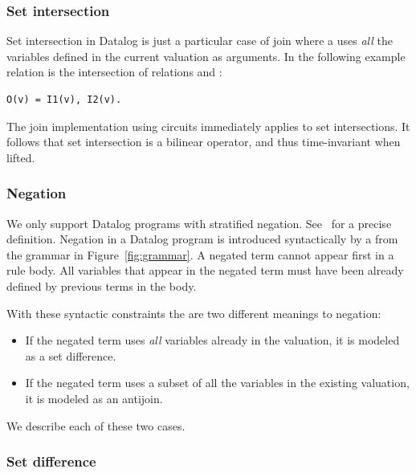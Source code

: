 \subsubsection{Set intersection}\label{sec:intersection}

Set intersection in Datalog is just a particular case of join where a 
uses \emph{all} the variables defined in the current valuation as arguments.
In the following example relation  is the
intersection of relations  and :

\begin{lstlisting}[language=ddlog]
O(v) = I1(v), I2(v).
\end{lstlisting}

The join implementation using circuits immediately applies to set intersections.
It follows that set intersection is a bilinear operator, and thus time-invariant
when lifted.

\subsubsection{Negation}\label{sec:negation}

We only support Datalog programs with stratified negation.
See~\cite{Abiteboul-book95} for a precise definition.
Negation in a Datalog program is introduced syntactically by a 
from the grammar in Figure~\ref{fig:grammar}.  A negated term
cannot appear first in a rule body.  All variables that
appear in the negated term must have been already defined
by previous terms in the body.

With these syntactic constraints the are two different meanings to
negation:

\begin{itemize}
    \item If the negated term uses \emph{all} variables already in the valuation,
    it is modeled as a set difference.
    \item If the negated term uses a subset of all the variables in the
    existing valuation, it is modeled as an antijoin.
\end{itemize}

We describe each of these two cases.

\subsubsection{Set difference}\label{sec:set-difference}


